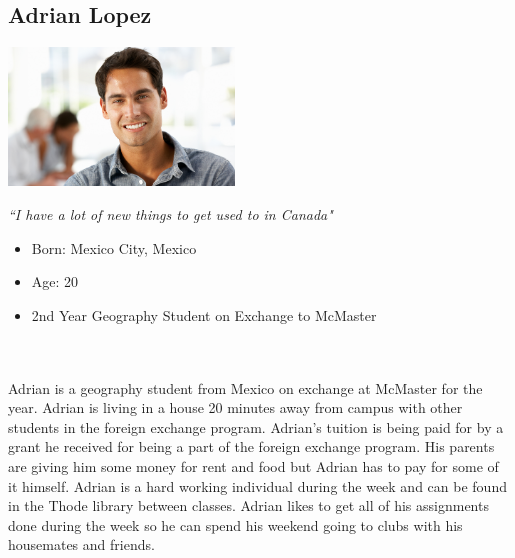 \documentclass[10pt]{article}
\begin{document}
\vspace{4mm}
\subsection*{Adrian Lopez}

\begin{minipage}{60mm}
\includegraphics[width=60mm]{Adrian.png}
\begin{center}
\emph{``I have a lot of new things to get used to in Canada"}
\end{center}
\end{minipage}\hfill
\begin{minipage}{\textwidth}
\begin{itemize}
\item Born: Mexico City, Mexico
\item Age: 20
\item 2nd Year Geography Student on Exchange to McMaster
\end{itemize}
\end{minipage}\\\\

Adrian is a geography student from Mexico on exchange at McMaster for the year. Adrian is living in a house 20 minutes away from campus with other students in the foreign exchange program. Adrian's tuition is being paid for by a grant he received for being a part of the foreign exchange program. His parents are giving him some money for rent and food but Adrian has to pay for some of it himself. Adrian is a hard working individual during the week and can be found in the Thode library between classes. Adrian likes to get all of his assignments done during the week so he can spend his weekend going to clubs with his housemates and friends.\\
\end{document}
